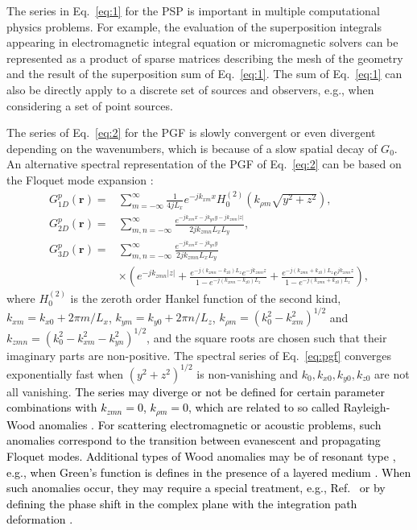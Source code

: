 \documentclass{article}
\begin{document}
The series in Eq.~\eqref{eq:1} for the PSP is important in multiple computational physics problems. For example, the evaluation of the superposition integrals appearing in electromagnetic integral equation or micromagnetic solvers \cite{Fastmag} can be represented as a product of sparse matrices describing the mesh of the geometry and the result of the superposition sum of Eq.~\eqref{eq:1}. The sum of Eq.~\eqref{eq:1} can also be directly apply to a discrete set of sources and observers, e.g., when considering a set of point sources. 

The series of Eq.~\eqref{eq:2} for the PGF is slowly convergent or even divergent depending on the wavenumbers, which is because of a slow spatial decay of $G_0$. An alternative spectral representation of the PGF of Eq.~\eqref{eq:2} can be based on the Floquet mode expansion \cite{Derek}:
\begin{subequations}\label{eq:pgf}
    \begin{align}
        G^{p}_{1D}(\mathbf{r})=&\sum_{m=-\infty}^{\infty}\frac{1}{4jL_x}e^{-jk_{xm}x}H_0^{(2)}(k_{\rho m}\sqrt{y^2+z^2}), \label{eq:pgf_1} \\
        G^{p}_{2D}(\mathbf{r})=&\sum_{m,n=-\infty}^{\infty}\frac{e^{-jk_{xm}x-jk_{yn}y-jk_{zmn}|z|}}{2jk_{zmn}L_xL_y}, \label{eq:pgf_2} \\
        G^{p}_{3D}(\mathbf{r})=&\sum_{m,n=-\infty}^{\infty}\frac{e^{-jk_{xm}x-jk_{yn}y}}{2jk_{zmn}L_xL_y}\nonumber \\
        &\times\left(e^{-jk_{zmn}|z|}+\frac{e^{-j(k_{zmn}-k_{z0})L_z}e^{-jk_{zmn}z}}{1-e^{-j(k_{zmn}-k_{z0})L_z}}+  \frac{e^{-j(k_{zmn}+k_{z0})L_z}e^{jk_{zmn}z}}{1-e^{-j(k_{zmn}+k_{z0})L_z}}\right), \label{eq:pgf_3}
    \end{align}
\end{subequations}
where $H_0^{(2)}$ is the zeroth order Hankel function of the second kind, $k_{xm}=k_{x0}+2\pi m /L_x$, $k_{ym}=k_{y0}+2\pi n /L_z$, $k_{\rho m}=(k_0^2-k_{xm}^2)^{1/2}$ and $k_{zmn}=(k_0^2-k_{xm}^2-k_{yn}^2)^{1/2}$, and the square roots are chosen such that their imaginary parts are non-positive. The spectral series of Eq.~\eqref{eq:pgf} converges exponentially fast when $(y^2+z^2)^{1/2}$ is non-vanishing and $k_0,k_{x0},k_{y0},k_{z0}$ are not all vanishing. \textcolor{black}{The series may diverge or not be defined for certain parameter combinations with $k_{zmn}=0$, $k_{\rho m}=0$, which are related to so called Rayleigh-Wood anomalies \cite{Barnett2011, PhysRevB.71.235117, 4232642, Hessel:65}. For scattering electromagnetic or acoustic problems, such anomalies correspond to the transition between evanescent and propagating Floquet modes. Additional types of Wood anomalies may be of resonant type \cite{Hessel:65}, e.g., when Green's function is defines in the presence of a layered medium \cite{6059491}. When such anomalies occur, they may require a special treatment, e.g., Ref.~\cite{Barnett2011} or by defining the phase shift in the complex plane with the integration path deformation \cite{4232642,1603823}.}
\end{document}
